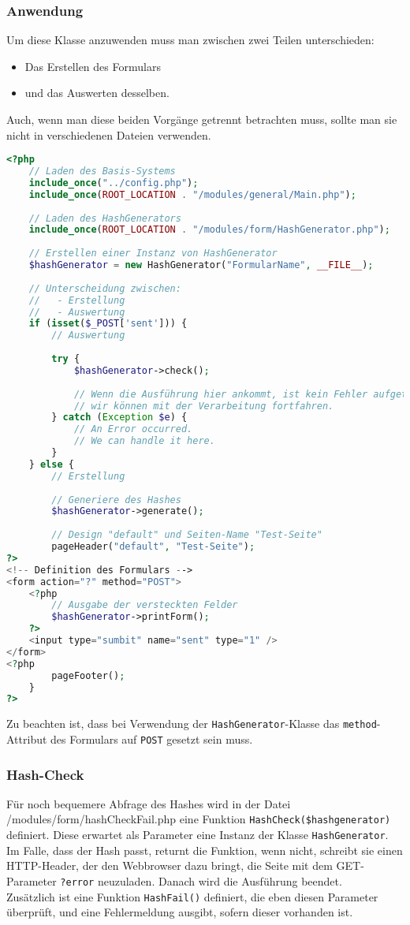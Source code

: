 \subsubsection{Anwendung}
Um diese Klasse anzuwenden muss man zwischen zwei Teilen unterschieden:
\begin{itemize}
	\item Das Erstellen des Formulars
	\item und das Auswerten desselben.
\end{itemize}
Auch, wenn man diese beiden Vorgänge getrennt betrachten muss, sollte man sie nicht in verschiedenen Dateien verwenden.
\begin{lstlisting}[style=custom, language=php, caption={Anwendung von \texttt{HashGenerator}},label={lst:content_imple_hash_example}]
<?php
	// Laden des Basis-Systems
	include_once("../config.php");
	include_once(ROOT_LOCATION . "/modules/general/Main.php");
	
	// Laden des HashGenerators
	include_once(ROOT_LOCATION . "/modules/form/HashGenerator.php");
	
	// Erstellen einer Instanz von HashGenerator
	$hashGenerator = new HashGenerator("FormularName", __FILE__);
	
	// Unterscheidung zwischen:
	//   - Erstellung
	//   - Auswertung
	if (isset($_POST['sent'])) {
		// Auswertung
		
		try {
			$hashGenerator->check();
			
			// Wenn die Ausführung hier ankommt, ist kein Fehler aufgetreten,
			// wir können mit der Verarbeitung fortfahren.
		} catch (Exception $e) {
			// An Error occurred.
			// We can handle it here.
		}
	} else {
		// Erstellung
		
		// Generiere des Hashes
		$hashGenerator->generate();
		
		// Design "default" und Seiten-Name "Test-Seite"
		pageHeader("default", "Test-Seite");
?>
<!-- Definition des Formulars -->
<form action="?" method="POST">
	<?php
		// Ausgabe der versteckten Felder
		$hashGenerator->printForm();
	?>
	<input type="sumbit" name="sent" type="1" />
</form>
<?php
		pageFooter();
	}
?>
\end{lstlisting}
Zu beachten ist, dass bei Verwendung der \texttt{HashGenerator}-Klasse das \texttt{method}-Attribut des Formulars auf \texttt{POST} gesetzt sein muss.

\subsubsection{Hash-Check}
Für noch bequemere Abfrage des Hashes wird in der Datei /modules/form/hashCheckFail.php eine Funktion \texttt{HashCheck(\$hashgenerator)} definiert. Diese erwartet als Parameter eine Instanz der Klasse \texttt{HashGenerator}. Im Falle, dass der Hash passt, returnt die Funktion, wenn nicht, schreibt sie einen HTTP-Header, der den Webbrowser dazu bringt, die Seite mit dem GET-Parameter \texttt{?error} neuzuladen. Danach wird die Ausführung beendet.\\
Zusätzlich ist eine Funktion \texttt{HashFail()} definiert, die eben diesen Parameter überprüft, und eine Fehlermeldung ausgibt, sofern dieser vorhanden ist.